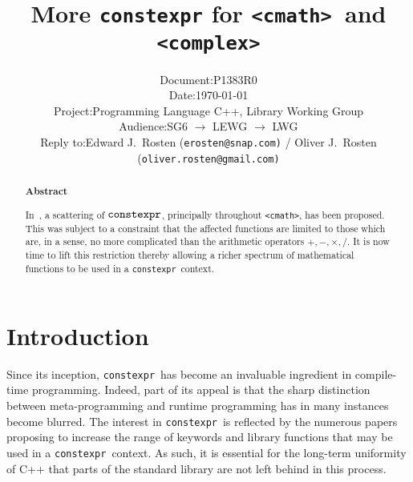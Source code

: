 \documentclass[prd,twocolumn,amsmath,amssymb,nofootinbib,eqsecnum]{revtex4-1}
\newcommand{\constexpr}{\code{constexpr}\xspace}
\newcommand{\code}[1]{{\tt #1}}
\newcommand{\header}[1]{{\tt <#1>}}
\newcommand{\cmath}{\header{cmath}}
\newcommand{\complex}{\header{complex}}
\newcommand{\Operators}{\ensuremath{+,-,\times,/}}
\begin{document}
\title{More \constexpr for \cmath\ and \complex}

\author{
\hspace{11.5em}
\begin{tabular}{ll}
	Document: & P1383R0
\\
	Date: & \today
\\
	Project: & Programming Language C++, Library Working Group
\\
	Audience: & SG6 $\rightarrow$ LEWG $\rightarrow$ LWG
\\
	Reply to: & Edward J.\ Rosten {(\tt erosten@snap.com)}
 / Oliver J.\ Rosten {(\tt oliver.rosten@gmail.com)}
\end{tabular}
}

\begin{abstract}

\begin{center} {\bf Abstract} \end{center}

In~\cite{Rosten-constexpr}, a scattering of $\constexpr$, principally throughout \cmath, has been proposed. This was subject to a constraint that the affected functions are limited to those which are, in a sense, no more complicated than the arithmetic operators \Operators. It is now time to lift this restriction thereby allowing a richer spectrum of mathematical functions to be used in a \constexpr\ context.
	
\end{abstract}


\maketitle

\tableofcontents

\section{Introduction}

Since its inception, \constexpr\ has become an invaluable ingredient in compile-time programming. Indeed, part of its appeal is that the sharp distinction between meta-programming and runtime programming has in many instances become blurred. The interest in \constexpr\ is reflected by the numerous papers proposing to increase the range of keywords and library functions that may be used in a \constexpr\ context. As such, it is essential for the long-term uniformity of C++ that parts of the standard library are not left behind in this process.
\end{document}
